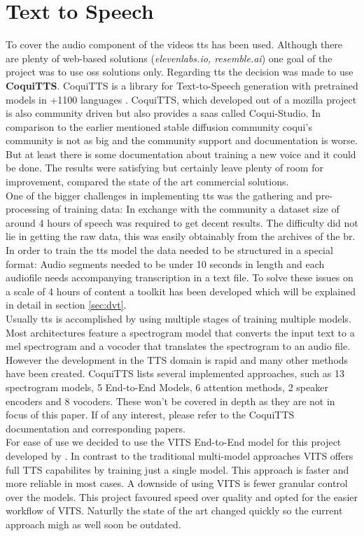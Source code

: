 \documentclass[
  a4paper,  %
  twoside,  %
  bibliography=totoc,
  headsepline,
  cleardoublepage=empty,
  parskip=half,
  draft=false
]{scrbook}
\begin{document}
\section{Text to Speech}
\label{sec:tts}
To cover the audio component of the videos \gls{tts} has been used. Although there are plenty of web-based solutions (\textit{elevenlabs.io, resemble.ai}) one goal of the project was to use \gls{oss} solutions only. Regarding \gls*{tts} the decision was made to use \textbf{CoquiTTS}. CoquiTTS is a library for Text-to-Speech generation with pretrained models in +1100 languages \cite{erenCoquiTTS2021}. CoquiTTS, which developed out of a mozilla project is also community driven but also provides a \gls{saas} called Coqui-Studio. In comparison to the earlier mentioned stable diffusion community coqui's community is not as big and the community support and documentation is worse. But at least there is some documentation about training a new voice and it could be done. The results were satisfying but certainly leave plenty of room for improvement, compared the state of the art commercial solutions. \\
One of the bigger challenges in implementing \gls{tts} was the gathering and pre-processing of training data: 
In exchange with the community a dataset size of around 4 hours of speech was required to get decent results. The difficulty did not lie in getting the raw data, this was easily obtainably from the archives of the \gls{br}. In order to train the \gls{tts} model the data needed to be structured in a special format: Audio segments needed to be under 10 seconds in length and each audiofile needs accompanying transcription in a text file. To solve these issues on a scale of 4 hours of content a toolkit has been developed which will be explained in detail in section \ref{sec:dvt}. \\ 
Usually \gls{tts} is accomplished by using multiple stages of training multiple models. Most architectures feature a spectrogram model that converts the input text to a mel spectrogram and a vocoder that translates the spectrogram to an audio file. However the development in the TTS domain is rapid and many other methods have been created. 
CoquiTTS lists several implemented approaches, such as 13 spectrogram models, 5 End-to-End Models, 6 attention methods, 2 speaker encoders and 8 vocoders. These won't be covered in depth as they are not in focus of this paper. If of any interest, please refer to the CoquiTTS documentation and corresponding papers.\\
For ease of use we decided to use the VITS End-to-End model for this project developed by \citet{kimConditionalVariationalAutoencoder2021}. In contrast to the traditional multi-model approaches VITS offers full TTS capabilites by training just a single model. This approach is faster and more reliable in most cases. A downside of using VITS is fewer granular control over the models. This project favoured speed over quality and opted for the easier workflow of VITS. Naturlly the state of the art changed quickly so the current approach migh as well soon be outdated.\\
\end{document}
